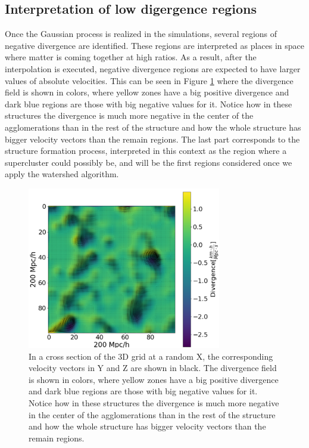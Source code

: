 \documentclass[usenatbib]{mnras}
\begin{document}
\subsection{Interpretation of low digergence regions}
Once the Gaussian process is realized in the simulations, several regions of negative divergence are identified. These regions are interpreted as places in space where matter is coming together at high ratios. As a result, after the interpolation is executed, negative divergence regions are expected to have larger values of absolute velocities. This can be seen in Figure \ref{fig:grad_vel_fields} where the divergence field is shown in colors, where yellow zones have a big positive divergence and dark blue regions are those with big negative values for it. Notice how in these structures the divergence is much more negative in the center of the agglomerations than in the rest of the structure and how the whole structure has bigger velocity vectors than the remain regions. The last part corresponds to the structure formation process, interpreted in this context as the region where a supercluster could possibly be, and will be the first regions considered once we apply the watershed algorithm.

\begin{figure}
    \centering
    \includegraphics[width=240pt]{grad_vel_fields.pdf}
    \caption{In a cross section of the 3D grid at a random X, the corresponding  velocity vectors in Y and Z are shown in black. The divergence field is shown in colors, where yellow zones have a big positive divergence and dark blue regions are those with big negative values for it. Notice how in these structures the divergence is much more negative in the center of the agglomerations than in the rest of the structure and how the whole structure has bigger velocity vectors than the remain regions.}
    \label{fig:grad_vel_fields}
\end{figure}
\end{document}
